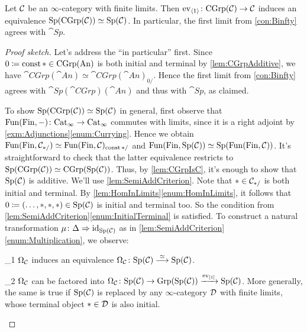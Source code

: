 \begin{lem}\label{lem:SpCGrpIsSp}
	Let $\mathcal{C}$ be an $\infty$-category with finite limits. Then $\operatorname{ev}_{\langle 1\rangle}\colon \mathrm{CGrp}(\mathcal{C})\rightarrow \mathcal{C}$ induces an equivalence $\mathrm{Sp}(\mathrm{CGrp}(\mathcal{C}))\simeq \mathrm{Sp}(\mathcal{C})$. In particular, the first limit from \cref{con:Binfty} agrees with $\cat{Sp}$.
\end{lem}
\begin{proof}[Proof sketch]
	Let's address the \enquote{in particular} first. Since $0\coloneqq \operatorname{const} *\in\mathrm{CGrp}(\mathrm{An})$ is both initial and terminal by \cref{lem:CGrpAdditive}, we have $\cat{CGrp}(\cat{An})\simeq \cat{CGrp}(\cat{An})_{0/}$. Hence the first limit from \cref{con:Binfty} agrees with $\cat{Sp}(\cat{CGrp})(\cat{An})$ and thus with $\cat{Sp}$, as claimed.
	
	To show $\mathrm{Sp}(\mathrm{CGrp}(\mathcal{C}))\simeq \mathrm{Sp}(\mathcal{C})$ in general, first observe that $\operatorname{Fun}(\mathrm{Fin},-)\colon \mathrm{Cat}_\infty\rightarrow \mathrm{Cat}_\infty$ commutes with limits, since it is a right adjoint by \cref{exm:Adjunctions}\cref{enum:Currying}. Hence we obtain $\operatorname{Fun}(\mathrm{Fin},\mathcal{C}_{*/})\simeq \operatorname{Fun}(\mathrm{Fin},\mathcal{C})_{\operatorname{const} */}$ and  $\operatorname{Fun}(\mathrm{Fin},\mathrm{Sp}(\mathcal{C}))\simeq \mathrm{Sp}(\operatorname{Fun}(\mathrm{Fin},\mathcal{C}))$. It's straightforward to check that the latter equivalence restricts to $\mathrm{Sp}(\mathrm{CGrp}(\mathcal{C}))\simeq \mathrm{CGrp}(\mathrm{Sp}(\mathcal{C}))$. Thus, by \cref{lem:CGrpIsC}, it's enough to show that $\mathrm{Sp}(\mathcal{C})$ is additive. We'll use \cref{lem:SemiAddCriterion}. Note that $*\in\mathcal{C}_{*/}$ is both initial and terminal. By \cref{lem:HomInLimits}\cref{enum:HomInLimits}, it follows that $0\coloneqq (\dotsc,*,*,*)\in \mathrm{Sp}(\mathcal{C})$ is initial and terminal too. So the condition from \cref{lem:SemiAddCriterion}\cref{enum:InitialTerminal} is satisfied. To construct a natural transformation $\mu\colon \Delta\Rightarrow \operatorname{id}_{\mathrm{Sp}(\mathcal{C})}$ as in \cref{lem:SemiAddCriterion}\cref{enum:Multiplication}, we observe:
	\begin{alphanumerate}\itshape
		\item[\boxtimes_1] $\Omega_{\mathcal{C}}$ induces an equivalence $\Omega_{\mathcal{C}}\colon \mathrm{Sp}(\mathcal{C})\overset{\simeq}{\longrightarrow}\mathrm{Sp}(\mathcal{C})$.\label{claim:OmegaEquivalence}
		\item[\boxtimes_2] $\Omega_{\mathcal{C}}$ can be factored into $\Omega_{\mathcal{C}}\colon\mathrm{Sp}(\mathcal{C})\rightarrow \mathrm{Grp}(\mathrm{Sp}(\mathcal{C}))\xrightarrow{\operatorname{ev}_{[1]}}\mathrm{Sp}(\mathcal{C})$. More generally, the same is true if $\mathrm{Sp}(\mathcal{C})$ is replaced by any $\infty$-category $\mathcal{D}$ with finite limits, whose terminal object $*\in\mathcal{D}$ is also initial.\label{claim:OmegaGrp}

\end{alphanumerate}
\end{proof}
